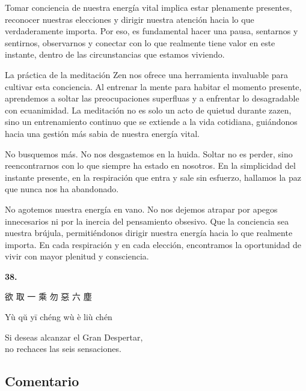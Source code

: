 \documentclass[
  a5paperpaper,
]{article}
\begin{document}
Tomar conciencia de nuestra energía vital implica estar plenamente
presentes, reconocer nuestras elecciones y dirigir nuestra atención
hacia lo que verdaderamente importa. Por eso, es fundamental hacer una
pausa, sentarnos y sentirnos, observarnos y conectar con lo que
realmente tiene valor en este instante, dentro de las circunstancias que
estamos viviendo.

La práctica de la meditación Zen nos ofrece una herramienta invaluable
para cultivar esta conciencia. Al entrenar la mente para habitar el
momento presente, aprendemos a soltar las preocupaciones superfluas y a
enfrentar lo desagradable con ecuanimidad. La meditación no es solo un
acto de quietud durante zazen, sino un entrenamiento continuo que se
extiende a la vida cotidiana, guiándonos hacia una gestión más sabia de
nuestra energía vital.

No busquemos más. No nos desgastemos en la huida. Soltar no es perder,
sino reencontrarnos con lo que siempre ha estado en nosotros. En la
simplicidad del instante presente, en la respiración que entra y sale
sin esfuerzo, hallamos la paz que nunca nos ha abandonado.

No agotemos nuestra energía en vano. No nos dejemos atrapar por apegos
innecesarios ni por la inercia del pensamiento obsesivo. Que la
conciencia sea nuestra brújula, permitiéndonos dirigir nuestra energía
hacia lo que realmente importa. En cada respiración y en cada elección,
encontramos la oportunidad de vivir con mayor plenitud y consciencia.

\hfill\break

\hypertarget{03}{}
\begin{verseblock}

\newpage

\begin{center}\textbf{38.}\end{center}

欲 取 一 乘 勿 惡 六 塵

Yù qŭ yī chéng wù è liù chén

Si deseas alcanzar el Gran Despertar,\\
no rechaces las seis sensaciones.

\end{verseblock}

\hfill\break

\hypertarget{comentario-37}{%
\subsection{Comentario}\label{comentario-37}}
\end{document}
